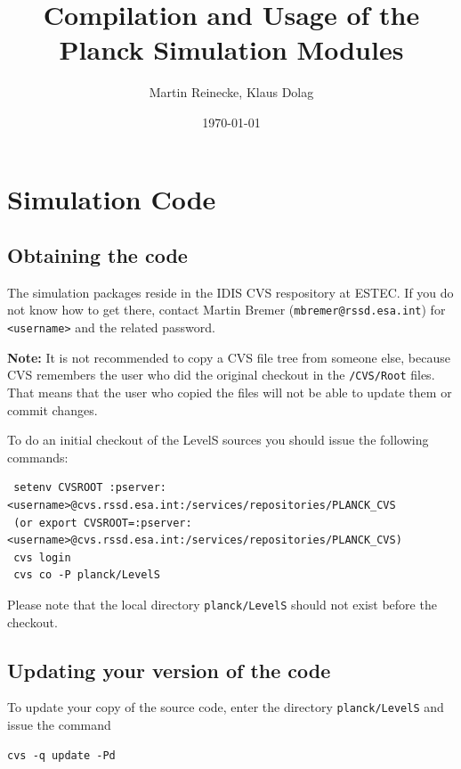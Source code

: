 \documentclass[pdf]{planckDoc}
\begin{document}
\renewcommand{\d}{\mathrm{d}}
\newcommand{\tw}[1]{\texttt{#1}}

\title{Compilation and Usage of the Planck Simulation Modules}
\author{Martin Reinecke, Klaus Dolag}
\date{\today}

\frontpage

\section{Simulation Code}

\subsection{Obtaining the code}

The simulation packages reside in the IDIS CVS respository
at ESTEC. If you do not know how to get there, contact Martin Bremer
(\tw{mbremer@rssd.esa.int}) for \tw{<username>}
and the related password.

{\bf Note:} It is not recommended to copy a CVS file tree from someone else,
because CVS remembers the user who did the original checkout in the
{\tt */CVS/Root} files. That means that the user who copied the files
will not be able to update them or commit changes.

To do an initial checkout of the LevelS sources you should issue the
following commands:
 \begin{verbatim}
 setenv CVSROOT :pserver:<username>@cvs.rssd.esa.int:/services/repositories/PLANCK_CVS
 (or export CVSROOT=:pserver:<username>@cvs.rssd.esa.int:/services/repositories/PLANCK_CVS)
 cvs login
 cvs co -P planck/LevelS
 \end{verbatim}

Please note that the local directory {\tt planck/LevelS} should not exist
before the checkout.

\subsection{Updating your version of the code}

To update your copy of the source code, enter the directory \tw{planck/LevelS}
and issue the command
\begin{verbatim}
cvs -q update -Pd
\end{verbatim}
\end{document}
